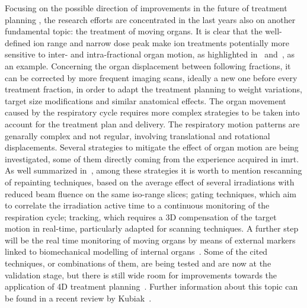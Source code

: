 Focusing on the possible direction of improvements in the future of treatment planning , the research efforts are concentrated in the last years also on another fundamental topic: the treatment of moving organs. It is clear that the well-defined ion range and narrow dose peak make ion treatments potentially more sensitive to inter- and intra-fractional organ motion, as highlighted in~\cite{Phillips1992, Bert2008, Engelsman2013} and~\cite{Thornqvist2013}, as an example. Concerning the organ displacement between following fractions, it can be corrected by more frequent imaging scans, ideally a new one before every treatment fraction, in order to adapt the treatment planning to weight variations, target size modifications and similar anatomical effects. The organ movement caused by the respiratory cycle requires more complex strategies to be taken into account for the treatment plan and delivery. The respiratory motion patterns are genarally complex and not regular, involving translational and rotational displacements. Several strategies to mitigate the effect of organ motion are being investigated, some of them directly coming from the experience acquired in \gls{imrt}. As well summarized in~\cite{Schardt2010}, among these strategies it is worth to mention rescanning of repainting techniques, based on the average effect of several irradiations with reduced beam fluence on the same iso-range slices; gating techniques, which aim to correlate the irradiation active time to a continuous monitoring of the respiration cycle; tracking, which requires a 3D compensation of the target motion in real-time, particularly adapted for scanning techniques. A further step will be the real time monitoring of moving organs by means of external markers linked to biomechanical modelling of internal organs~\parencite{Manescu2013}. Some of the cited techniques, or combinations of them, are being tested and are now at the validation stage, but there is still wide room for improvements towards the application of 4D treatment planning~\parencite{Graeff2013, Bert2017}. Further information about this topic  can be found in a recent review by Kubiak~\parencite{Kubiak2016}.    
